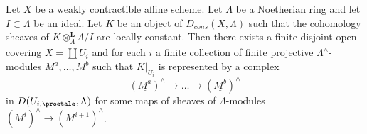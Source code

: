 %
\begin{lemma}
\label{lemma-local-structure-constructible-complex}
Let $X$ be a weakly contractible affine scheme. Let $\Lambda$ be a Noetherian
ring and let $I \subset \Lambda$ be an ideal. Let $K$ be an object of
$D_{cons}(X, \Lambda)$ such that the cohomology sheaves of
$K \otimes_\Lambda^\mathbf{L} \underline{\Lambda/I}$ are locally
constant. Then there exists a finite disjoint open covering
$X = \coprod U_i$ and for each $i$ a finite collection of
finite projective $\Lambda^\wedge$-modules $M^a, \ldots, M^b$
such that $K|_{U_i}$ is represented by a complex
$$
(\underline{M^a})^\wedge \to \ldots \to (\underline{M^b})^\wedge
$$
in $D(U_{i, \proetale}, \Lambda)$ for some maps of sheaves of
$\Lambda$-modules $(\underline{M^i})^\wedge \to (\underline{M^{i + 1}})^\wedge$.
\end{lemma}

